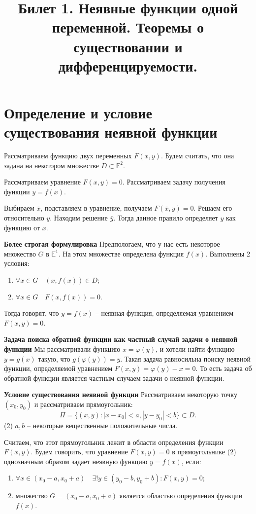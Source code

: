 \documentclass{article}
\title{Билет 1. Неявные функции одной переменной. Теоремы о существовании и
дифференцируемости.}
\author{}
\date{}
\theoremstyle{plain}
\theoremstyle{definition}
\theoremstyle{remark}
\begin{document}
\maketitle

\section*{Определение и условие существования неявной функции}
Рассматриваем функцию двух переменных $F(x, y)$. Будем считать, что она задана
на некотором множестве $D \subset \mathbb{E}^2$.

Рассматриваем уравнение $F(x, y) = 0$. Рассматриваем задачу получения функции
$y = f(x)$.

Выбираем $\bar{x}$, подставляем в уравнение, получаем $F(\bar{x}, y) = 0$. Решаем его относительно
$y$. Находим решение $\bar{y}$. Тогда данное правило определяет $y$ как функцию от $x$.

\textbf{Более строгая формулировка}
Предпологаем, что у нас есть некоторое множество $G$ в $\mathbb{E}^1$. На этом множестве
определена функция $f(x)$. Выполнены 2 условия:
\begin{enumerate}
    \item $\forall x \in G \quad (x, f(x)) \in D$;
    \item $\forall x \in G \quad F(x, f(x)) = 0$.
\end{enumerate}
Тогда говорят, что $y=f(x)$ -- неявная функция, определяемая уравнением $F(x, y) = 0$.

\textbf{Задача поиска обратной функции как частный случай задачи о неявной функции}
Мы рассматривали функцию $x = \varphi(y)$, и хотели найти функцию $y = g(x)$ такую, что
$g(\varphi(y)) = y$. Такая задача равносильна поиску неявной функции, определяемой уравнением
$F(x, y) = \varphi(y) - x = 0$. То есть задача об обратной функции является частным случаем задачи о неявной функции.

\textbf{Условие существования неявной функции}
Рассматриваем некоторую точку $(x_0, y_0)$ и рассматриваем прямоугольник:
\[\Pi = \{(x, y) : |x - x_0| < a, |y - y_0| < b\} \subset D.\] (2)
$a, b$ -- некоторые вещественные положительные числа.

Считаем, что этот прямоугольник лежит в области определения функции $F(x, y)$.
Будем говорить, что уравнение $F(x, y) = 0$ в прямоугольнике (2) однозначным
образом задает неявную функцию $y = f(x)$, если:
\begin{enumerate}
    \item $\forall x \in (x_0 - a, x_0 + a) \quad \exists! y \in (y_0 - b, y_0 + b) : F(x, y) = 0$;
    \item множество $G = (x_0 - a, x_0 + a)$ является областью определения функции $f(x)$.
\end{enumerate}
\end{document}
